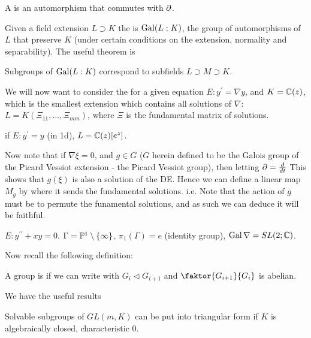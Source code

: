 \documentclass{article}
\begin{document}
\begin{definition}
A  is an automorphism that commutes with $\partial$. 
\end{definition}

Given a field extension $L \supset K$ the  is $\operatorname{Gal}(L:K)$, the group of automorphisms of $L$ that preserve $K$ (under certain conditions on the extension, normality and separability). 
The useful theorem is 
\begin{theorem}
Subgroups of $\operatorname{Gal}(L:K)$ correspond to subfields $L \supset M \supset K$. 
\end{theorem}

We will now want to consider the  for a given equation $E: y^\prime = \nabla y$, and $K=\mathbb{C}(z)$, which is the smallest extension which contains all solutions of $\nabla$: $L = K(\Xi_{11}, \dots, \Xi_{mm})$, where $\Xi$ is the fundamental matrix of solutions. 

\begin{example}
if $E: y^\prime = y$ (in 1d), $L = \mathbb{C}(z)[e^z]$. 
\end{example}

Now note that if $\nabla \xi =0$, and $g \in G$ ($G$ herein defined to be the Galois group of the Picard Vessiot extension - the Picard Vessiot group), then letting $\partial = \frac{d}{dt}$
This shows that $g(\xi)$ is also a solution of the DE. Hence we can define a linear map $M_g$ by where it sends the fundamental solutions. i.e.
Note that the action of $g$ must be to permute the funamental solutions, and as such we can deduce it will be faithful. 
\begin{example}
$E: y^{\prime\prime} + xy = 0$. $\Gamma = \mathbb{P}^1 \setminus \left\{ \infty \right\}$, $\pi_1(\Gamma) = e$ (identity group), $\operatorname{Gal}\nabla = SL(2;\mathbb{C})$. 
\end{example}

Now recall the following definition:
\begin{definition}
A group is  if we can write 
with $G_i \triangleleft G_{i+1}$ and $\faktor{G_{i+1}}{G_i}$ is abelian. 
\end{definition}

We have the useful results

\begin{theorem}
Solvable subgroups of $GL(m,K)$ can be put into triangular form if $K$ is algebraically closed, characteristic 0.
\end{theorem}
\end{document}
